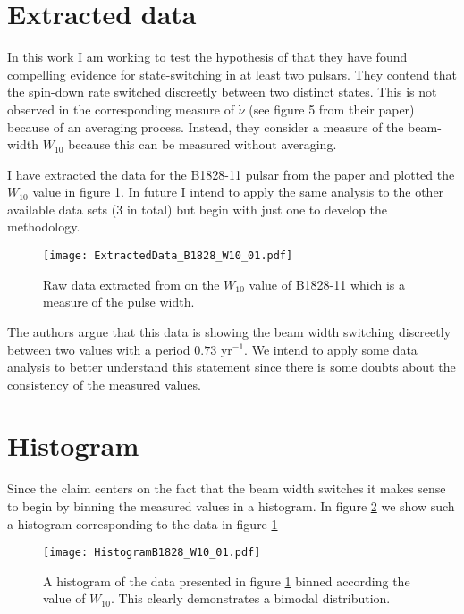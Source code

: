 \documentclass[/home/greg/Thesis/main/main.tex]{subfiles}
\begin{document}

\newcommand{\Phiexact}{\Phi_{\mathrm{exact}}}
\newcommand{\Phifit}{\Phi_{\mathrm{fit}}}
\newcommand{\wobbleangle}{\tilde{\theta}}
\FloatBarrier

\section{Extracted data}
\graphicspath{{/home/greg/Neutron_star_modelling/ExtractDataFromLyne/img/}}

In this work I am working to test the hypothesis of \citet{Lyne2010} that they
have found compelling evidence for state-switching in at least two pulsars. They
contend that the spin-down rate switched discreetly between two distinct states.
This is not observed in the corresponding measure of $\dot{\nu}$ (see figure 5
from their paper) because of an averaging process. Instead, they consider a
measure of the beam-width $W_{10}$ because this can be measured without averaging.

I have extracted the data for the B1828-11 pulsar from the \citet{Lyne2010}
paper and plotted the $W_{10}$ value in figure \ref{fig: B1828 data}. In future
I intend to apply the same analysis to the other available data sets (3 in total)
but begin with just one to develop the methodology.
\begin{figure}[htb]
    \centering
    \texttt{[image: ExtractedData\_B1828\_W10\_01.pdf]}
    \caption{Raw data extracted from \citet{Lyne2010} on the $W_{10}$ value of
             B1828-11 which is a measure of the pulse width.}
    \label{fig: B1828 data}
\end{figure}

The authors argue that this data is showing the beam width switching discreetly
between two values with a period $0.73$ yr$^{-1}$.  We intend to apply some
data analysis to better understand this statement since there is some doubts
about the consistency of the measured values.

\FloatBarrier
\section{Histogram}
Since the claim centers on the fact that the beam width switches it makes sense
to begin by binning the measured values in a histogram. In figure \ref{fig: B1828 hist}
we show such a histogram corresponding to the data in figure \ref{fig: B1828 data}
\begin{figure}[htb]
    \centering
    \texttt{[image: HistogramB1828\_W10\_01.pdf]}
    \caption{A histogram of the data presented in figure \ref{fig: B1828 data}
             binned according the value of $W_{10}$. This clearly demonstrates
             a bimodal distribution.}
    \label{fig: B1828 hist}
\end{figure}
\end{document}
